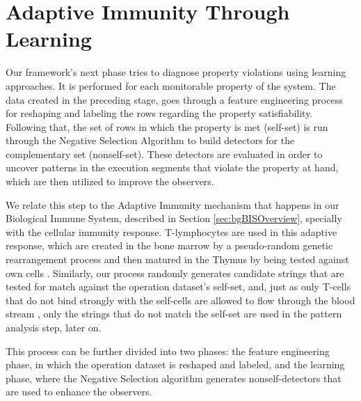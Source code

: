 \section{Adaptive Immunity Through Learning}

Our framework's next phase tries to diagnose property violations using learning approaches. It is performed for each monitorable property of the system. The data created in the preceding stage, goes through a feature engineering process for reshaping and labeling the rows regarding the property satisfiability. Following that, the set of rows in which the property is met (self-set) is run through the Negative Selection Algorithm to build detectors for the complementary set (nonself-set). These detectors are evaluated in order to uncover patterns in the execution segments that violate the property at hand, which are then utilized to improve the observers.


We relate this step to the Adaptive Immunity mechanism that happens in our Biological Immune System, described in Section \ref{sec:bgBISOverview}, specially with the cellular immunity response. T-lymphocytes are used in this adaptive response, which are created in the bone marrow by a pseudo-random genetic rearrangement process and then matured in the Thymus by being tested against own cells \cite{AIS2014}. Similarly, our process randomly generates candidate strings that are tested for match against the operation dataset's self-set, and, just as only T-cells that do not bind strongly with the self-cells are allowed to flow through the blood stream \cite{Kuby2019}, only the strings that do not match the self-set are used in the pattern analysis step, later on.

This process can be further divided into two phases: the feature engineering phase, in which the operation dataset is reshaped and labeled, and the learning phase, where the Negative Selection algorithm generates nonself-detectors that are used to enhance the observers.

